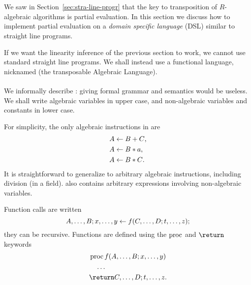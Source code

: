 \section{\tAL}
\label{sec:transAL}

We saw in Section~\ref{sec:stra-line-progr} that the key to
transposition of $R$-algebraic algorithms is partial evaluation. In
this section we discuss how to implement partial evaluation on a
\emph{domain specific language}
(DSL) similar to straight
line programs.

If we want the linearity inference of the previous section to work, we
cannot use standard straight line programs. We shall instead use a
functional language, nicknamed
\tAL{} (the
transposable Algebraic
Language).

\paragraph{\tAL{}}
\label{sec:ta}
We informally describe \tAL{}: giving formal grammar and semantics
would be useless. We shall write algebraic variables in upper case,
and non-algebraic variables and constants in lower case.

For simplicity, the only algebraic instructions in \tAL{} are
\begin{align}
  A &\leftarrow B + C
  \text{,}\\
  A &\leftarrow B * a
  \text{,}\\
  A &\leftarrow B * C
  \text{.}
\end{align}
It is straightforward to generalize to arbitrary algebraic
instructions, including division (in a field). \tAL{} also contains
arbitrary expressions involving non-algebraic variables.

Function calls are written
\begin{equation}
  \label{eq:58}
  A,\ldots,B;x,\ldots,y \leftarrow f(C, \ldots, D; t, \ldots, z)
  \text{;}
\end{equation}
they can be recursive. Functions are defined using the $\operatorname{proc}$ and
$\return$ keywords
\begin{equation}
  \label{eq:60}
  \begin{aligned}
    &\proc f (A,\ldots,B;x,\ldots,y)\\
    &\quad\ldots\\
    &\return C,\ldots,D;t,\ldots,z\text{.}
  \end{aligned}
\end{equation}


